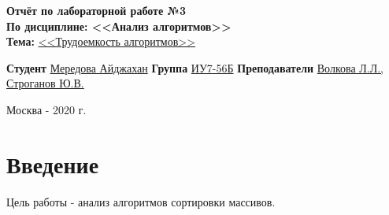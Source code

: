 \documentclass[a4paper]{article}
\begin{document}
\begin{titlepage}
		\vspace{30mm}
		\begin{center}
		\textbf{Отчёт по лабораторной работе №3}\\
		{\bf	По дисциплине: <<Анализ алгоритмов>>}\\
		{\bf Тема:} \underline {<<Трудоемкость алгоритмов>>}\\
		\end{center}
		\begin{flushleft}
			{\bf Студент}  \underline{Мередова Айджахан}\underline {\hspace{7cm}}
			\newline
			{\bf Группа} \underline{ИУ7-56Б}\underline {\hspace{10cm}}
			\newline
			{\bf Преподаватели} \underline {Волкова Л.Л., Строганов Ю.В.}
		\end{flushleft}
		\vfill
		
		\centering Москва - 2020 г.\\
	\end{titlepage}
	\pagestyle{plain}
	\setcounter{page}{2}
	\section*{Введение}
	Цель работы - анализ алгоритмов сортировки массивов. 
	
\end{document}
